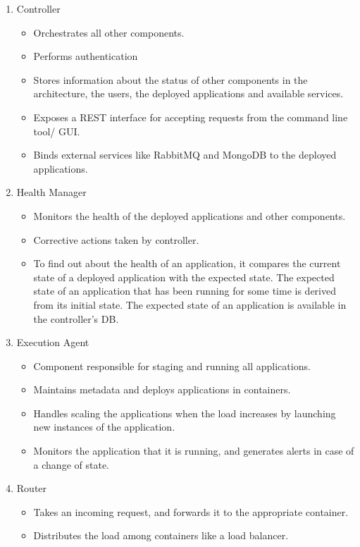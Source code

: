 \documentclass[a4paper]{article}
\begin{document}
  \begin{enumerate}
	  \item Controller
	  \begin{itemize}
		  \item Orchestrates all other components.
		  \item Performs authentication
		  \item Stores information about the status of other components in the architecture, the users, the deployed applications and available services.
		  \item Exposes a REST interface for accepting requests from the command line tool/ GUI.
		  \item Binds external services like RabbitMQ and MongoDB to the deployed applications.
	  \end{itemize}
	  \item Health Manager
	  \begin{itemize}
		  \item Monitors the health of the deployed applications and other components.
		  \item Corrective actions taken by controller.
		  \item To find out about the health of an application, it compares the current state of a deployed application with the expected state. The expected state of an application that has been running for some time is derived from its initial state. The expected state of an application is available in the controller’s DB.
	  \end{itemize}
	  \item Execution Agent
	  \begin{itemize}
		  \item Component responsible for staging and running all applications.
		  \item Maintains metadata and deploys applications in containers.
		  \item Handles scaling the applications when the load increases by launching new instances of the application.
		  \item Monitors the application that it is running, and generates alerts in case of a change of state.
	  \end{itemize}
	  \item Router
	  \begin{itemize}
		  \item Takes an incoming request, and forwards it to the appropriate container.
		  \item Distributes the load among containers like a load balancer.

\end{itemize}
\end{enumerate}
\end{document}
